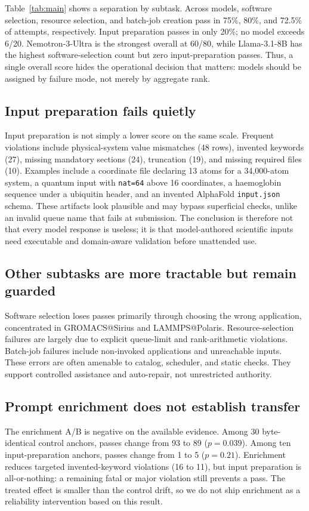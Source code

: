 \documentclass[conference]{IEEEtran}
\begin{document}
Table~\ref{tab:main} shows a separation by subtask. Across models, software selection, resource selection, and batch-job creation pass in 75\%, 80\%, and 72.5\% of attempts, respectively. Input preparation passes in only 20\%; no model exceeds 6/20. Nemotron-3-Ultra is the strongest overall at 60/80, while Llama-3.1-8B has the highest software-selection count but zero input-preparation passes. Thus, a single overall score hides the operational decision that matters: models should be assigned by failure mode, not merely by aggregate rank.

\subsection{Input preparation fails quietly}
Input preparation is not simply a lower score on the same scale. Frequent violations include physical-system value mismatches (48 rows), invented keywords (27), missing mandatory sections (24), truncation (19), and missing required files (10). Examples include a coordinate file declaring 13 atoms for a 34,000-atom system, a quantum input with \texttt{nat=64} above 16 coordinates, a haemoglobin sequence under a ubiquitin header, and an invented AlphaFold \texttt{input.json} schema. These artifacts look plausible and may bypass superficial checks, unlike an invalid queue name that fails at submission. The conclusion is therefore not that every model response is useless; it is that model-authored scientific inputs need executable and domain-aware validation before unattended use.

\subsection{Other subtasks are more tractable but remain guarded}
Software selection loses passes primarily through choosing the wrong application, concentrated in GROMACS@Sirius and LAMMPS@Polaris. Resource-selection failures are largely due to explicit queue-limit and rank-arithmetic violations. Batch-job failures include non-invoked applications and unreachable inputs. These errors are often amenable to catalog, scheduler, and static checks. They support controlled assistance and auto-repair, not unrestricted authority.

\subsection{Prompt enrichment does not establish transfer}
The enrichment A/B is negative on the available evidence. Among 30 byte-identical control anchors, passes change from 93 to 89 ($p=0.039$). Among ten input-preparation anchors, passes change from 1 to 5 ($p=0.21$). Enrichment reduces targeted invented-keyword violations (16 to 11), but input preparation is all-or-nothing: a remaining fatal or major violation still prevents a pass. The treated effect is smaller than the control drift, so we do not ship enrichment as a reliability intervention based on this result.
\end{document}
